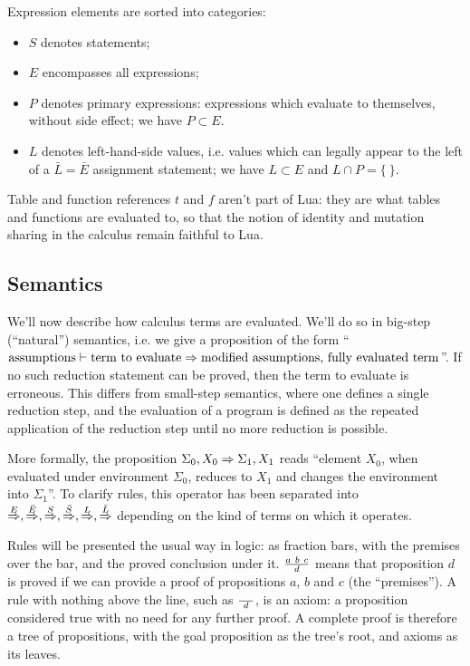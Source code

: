 Expression elements are sorted into categories:
\begin{itemize}
\item $S$ denotes statements;
\item $E$ encompasses all expressions;
\item $P$ denotes primary expressions: expressions which evaluate to
  themselves, without side effect; we have $P\subset E$.
\item $L$ denotes left-hand-side values, i.e. values which can legally
  appear to the left of a $\bar L=\bar E$ assignment statement; we
  have $L\subset E$ and $L\cap P=\{\ \}$.
\end{itemize}

Table and function references $t$ and $f$ aren't part of Lua: they are
what tables and functions are evaluated to, so that the notion of
identity and mutation sharing in the calculus remain faithful to Lua.

\subsection{Semantics}

We'll now describe how calculus terms are evaluated. We'll do so in
big-step (``natural'') semantics, i.e. we give a proposition of the
form ``$\textrm{assumptions} \vdash \textrm{term to evaluate} \Rightarrow
\textrm{modified assumptions, fully evaluated term}$''. If no such
reduction statement can be proved, then the term to evaluate is
erroneous. This differs from small-step semantics, where one defines a
single reduction step, and the evaluation of a program is defined as
the repeated application of the reduction step until no more reduction
is possible.

More formally, the proposition $\Sigma_0, X_0\Rightarrow\Sigma_1, X_1$
reads ``element $X_0$, when evaluated under environment $\Sigma_0$,
reduces to $X_1$ and changes the environment into $\Sigma_1$''. To
clarify rules, this operator has been separated into $\stackrel{E}{\Rightarrow},
\stackrel{\bar E}{\Rightarrow}, \stackrel{S}{\Rightarrow}, \stackrel{\bar S}{\Rightarrow}, \stackrel{L}{\Rightarrow}, \stackrel{\bar L}{\Rightarrow}$
depending on the kind of terms on which it operates.

Rules will be presented the usual way in logic: as fraction bars, with
the premises over the bar, and the proved conclusion under
it. $a\ b\ c \over d$ means that proposition $d$ is proved if we can
provide a proof of propositions $a$, $b$ and $c$ (the ``premises''). A
rule with nothing above the line, such as ${}\over \ d\ $, is an
axiom: a proposition considered true with no need for any further
proof. A complete proof is therefore a tree of propositions, with the
goal proposition as the tree's root, and axioms as its leaves.

